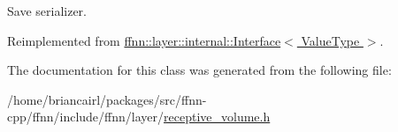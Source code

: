 Save serializer. 



Reimplemented from \hyperlink{classffnn_1_1layer_1_1internal_1_1_interface_a417d6fda112fdffed8091b0ebd78ed97}{ffnn\-::layer\-::internal\-::\-Interface$<$ Value\-Type $>$}.



The documentation for this class was generated from the following file\-:\begin{DoxyCompactItemize}
\item 
/home/briancairl/packages/src/ffnn-\/cpp/ffnn/include/ffnn/layer/\hyperlink{receptive__volume_8h}{receptive\-\_\-volume.\-h}\end{DoxyCompactItemize}
